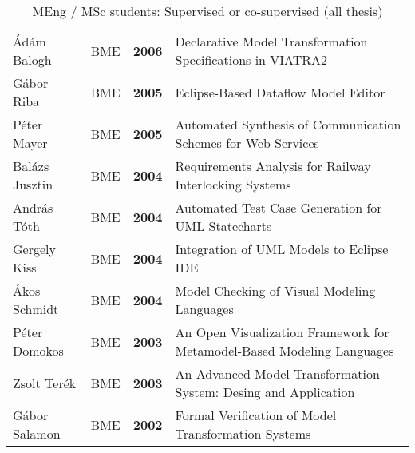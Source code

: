 \begin{table}[htb]
\begin{tabular}{@{}lllp{11cm}@{}}
\'Ad\'am Balogh & BME & \textbf{2006} & Declarative Model Transformation Specifications in VIATRA2\\ 
G\'abor Riba & BME & \textbf{2005} & Eclipse-Based Dataflow Model Editor \\ 
P\'eter Mayer & BME  & \textbf{2005} & Automated Synthesis of Communication Schemes for Web Services \\ 
Bal\'azs Jusztin & BME & \textbf{2004} & Requirements Analysis for Railway Interlocking Systems\\ 
Andr\'as T\'oth & BME & \textbf{2004} & Automated Test Case Generation for UML Statecharts\\ 
Gergely Kiss & BME & \textbf{2004} & Integration of UML Models to Eclipse IDE\\ 
\'Akos Schmidt & BME & \textbf{2004} & Model Checking of Visual Modeling Languages\\ 
P\'eter Domokos & BME & \textbf{2003} & An Open Visualization Framework for Metamodel-Based Modeling Languages\\ 
Zsolt Ter\'ek & BME & \textbf{2003} & An Advanced Model Transformation System: Desing and Application\\ 
G\'abor Salamon & BME & \textbf{2002} & Formal Verification of Model Transformation Systems\\ 
\bottomrule
\end{tabular}
\caption{MEng / MSc students: Supervised or co-supervised (all thesis)}
\label{tab:msc-supervised}
\end{table}

